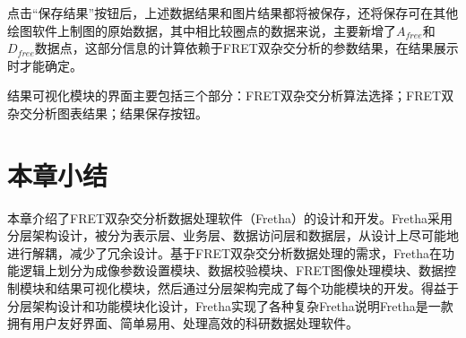 点击“保存结果”按钮后，上述数据结果和图片结果都将被保存，还将保存可在其他绘图软件上制图的原始数据，其中相比较圈点的数据来说，主要新增了$A_{free}$和$D_{free}$数据点，这部分信息的计算依赖于FRET双杂交分析的参数结果，在结果展示时才能确定。

结果可视化模块的界面主要包括三个部分：FRET双杂交分析算法选择；FRET双杂交分析图表结果；结果保存按钮。
\fi



\section{本章小结}

\ifshowtext
本章介绍了FRET双杂交分析数据处理软件（Fretha）的设计和开发。Fretha采用分层架构设计，被分为表示层、业务层、数据访问层和数据层，从设计上尽可能地进行解耦，减少了冗余设计。基于FRET双杂交分析数据处理的需求，Fretha在功能逻辑上划分为成像参数设置模块、数据校验模块、FRET图像处理模块、数据控制模块和结果可视化模块，然后通过分层架构完成了每个功能模块的开发。得益于分层架构设计和功能模块化设计，Fretha实现了各种复杂Fretha说明Fretha是一款拥有用户友好界面、简单易用、处理高效的科研数据处理软件。
\fi